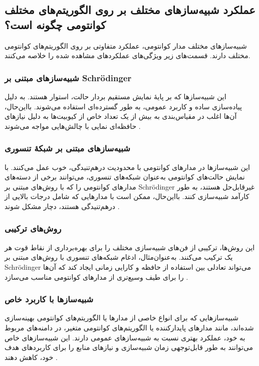 \subsection*{عملکرد شبیه‌سازهای مختلف بر روی الگوریتم‌های مختلف کوانتومی چگونه است؟}
شبیه‌سازهای مختلف مدار کوانتومی، عملکرد متفاوتی بر روی الگوریتم‌های کوانتومی مختلف دارند. قسمت‌های زیر ویژگی‌های عملکرد‌های مشاهده شده را خلاصه می‌کنند.
\subsubsection{شبیه‌سازهای مبتنی بر Schrödinger}
این شبیه‌سازها که بر پایهٔ نمایش مستقیم بردار حالت، استوار هستند. به دلیل پیاده‌سازی ساده و کاربرد عمومی، به طور گسترده‌ای استفاده می‌شوند. بااین‌حال، آن‌ها اغلب در مقیاس‌بندی به بیش از یک تعداد خاص از کیوبیت‌ها به دلیل نیازهای حافظه‌ای نمایی با چالش‌هایی مواجه می‌شوند \cite{young_simulating_2023}.

\subsubsection{شبیه‌سازهای مبتنی بر شبکهٔ تنسوری}
این شبیه‌سازها در مدارهای کوانتومی با محدودیت درهم‌تنیدگی، خوب عمل می‌کنند. با نمایش حالت‌های کوانتومی به‌عنوان شبکه‌های تنسوری، می‌توانند برخی از دسته‌های مدارهای کوانتومی را که با روش‌های مبتنی بر Schrödinger غیرقابل‌حل هستند، به طور کارآمد شبیه‌سازی کنند. بااین‌حال، ممکن است با مدارهایی که شامل درجات بالایی از درهم‌تنیدگی هستند، دچار مشکل شوند \cite{young_simulating_2023}.
\subsubsection{روش‌های ترکیبی}
این روش‌ها، ترکیبی از فن‌های شبیه‌سازی مختلف را برای بهره‌برداری از نقاط قوت هر یک ترکیب می‌کنند. به‌عنوان‌مثال، ادغام شبکه‌های تنسوری با روش‌های مبتنی بر Schrödinger می‌تواند تعادلی بین استفاده از حافظه و کارایی زمانی ایجاد کند که آن‌ها را برای طیف وسیع‌تری از مدارهای کوانتومی مناسب می‌سازد \cite{young_simulating_2023}.

\subsubsection{شبیه‌سازها با کاربرد خاص}
شبیه‌سازهایی که برای انواع خاصی از مدارها یا الگوریتم‌های کوانتومی بهینه‌سازی شده‌اند، مانند مدارهای پایدارکننده یا الگوریتم‌های کوانتومی متغیر، در دامنه‌های مربوط به خود، عملکرد بهتری نسبت به شبیه‌سازهای عمومی دارند. این شبیه‌سازهای خاص می‌توانند به طور قابل‌توجهی زمان شبیه‌سازی و نیازهای منابع را برای کاربردهای هدف خود، کاهش دهند \cite{young_simulating_2023}.


